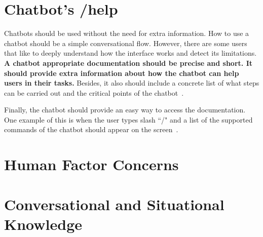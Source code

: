 \documentclass[a4paper,10pt]{article}
\begin{document}

\section{Chatbot's /help}

Chatbots should be used without the need for extra information. How to use a chatbot should be a simple conversational flow. However, there are some users that like to deeply understand how the interface works and detect its limitations. \textbf{A chatbot appropriate documentation should be precise and short. It should provide extra information about how the chatbot can help users in their tasks.} Besides, it also should include a concrete list of what steps can be carried out and the critical points of the chatbot~\cite{HeuristicsWebPage}. 

Finally, the chatbot should provide an easy way to access the documentation. One example of this is when the user types slash ``/" and a list of the supported commands of the chatbot should appear on the screen~\cite{botfather}.  

\section*{Human Factor Concerns}

\section{Conversational and Situational Knowledge}
\end{document}
